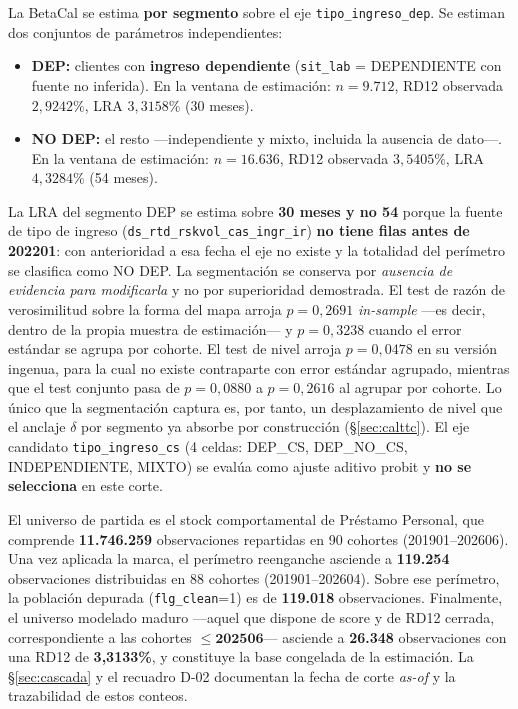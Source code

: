 \documentclass[12pt, a4paper]{article}
\begin{document}
La BetaCal se estima \textbf{por segmento} sobre el eje \texttt{tipo\_ingreso\_dep}. Se estiman
dos conjuntos de parámetros independientes:
\begin{itemize}[nosep]
  \item \textbf{DEP:} clientes con \textbf{ingreso dependiente} (\texttt{sit\_lab} =
    DEPENDIENTE con fuente no inferida). En la ventana de estimación: $n=9.712$,
    RD12 observada $2{,}9242\%$, LRA $3{,}3158\%$ (30 meses).
  \item \textbf{NO DEP:} el resto ---independiente y mixto, incluida la ausencia de dato---.
    En la ventana de estimación: $n=16.636$, RD12 observada $3{,}5405\%$, LRA $4{,}3284\%$
    (54 meses).
\end{itemize}
La LRA del segmento DEP se estima sobre \textbf{30 meses y no 54} porque la fuente de tipo de
ingreso (\texttt{ds\_rtd\_rskvol\_cas\_ingr\_ir}) \textbf{no tiene filas antes de 202201}: con
anterioridad a esa fecha el eje no existe y la totalidad del perímetro se clasifica como NO DEP.
La segmentación se conserva por \emph{ausencia de evidencia para modificarla} y no por
superioridad demostrada. El test de razón de verosimilitud sobre la forma del mapa arroja
$p=0{,}2691$ \textit{in-sample} ---es decir, dentro de la propia muestra de estimación--- y
$p=0{,}3238$ cuando el error estándar se agrupa por cohorte. El test de nivel arroja
$p=0{,}0478$ en su versión ingenua, para la cual no existe contraparte con error estándar
agrupado, mientras que el test conjunto pasa de $p=0{,}0880$ a $p=0{,}2616$ al agrupar por
cohorte. Lo único que la segmentación captura es, por tanto, un desplazamiento de nivel que el
anclaje $\delta$ por segmento ya absorbe por construcción (\S\ref{sec:calttc}). El eje candidato
\texttt{tipo\_ingreso\_cs} (4 celdas: DEP\_CS, DEP\_NO\_CS, INDEPENDIENTE, MIXTO) se evalúa como
ajuste aditivo probit y \textbf{no se selecciona} en este corte.

El universo de partida es el stock comportamental de Préstamo Personal, que comprende
\textbf{11.746.259} observaciones repartidas en 90 cohortes (201901--202606). Una vez aplicada la
marca, el perímetro reenganche asciende a \textbf{119.254} observaciones distribuidas en 88
cohortes (201901--202604). Sobre ese perímetro, la población depurada (\texttt{flg\_clean}=1) es
de \textbf{119.018} observaciones. Finalmente, el universo modelado maduro ---aquel que dispone de
score y de RD12 cerrada, correspondiente a las cohortes $\le\mathbf{202506}$--- asciende a
\textbf{26.348} observaciones con una RD12 de \textbf{3{,}3133\%}, y constituye la base congelada
de la estimación. La \S\ref{sec:cascada} y el recuadro D-02 documentan la fecha de corte
\emph{as-of} y la trazabilidad de estos conteos.
\end{document}
